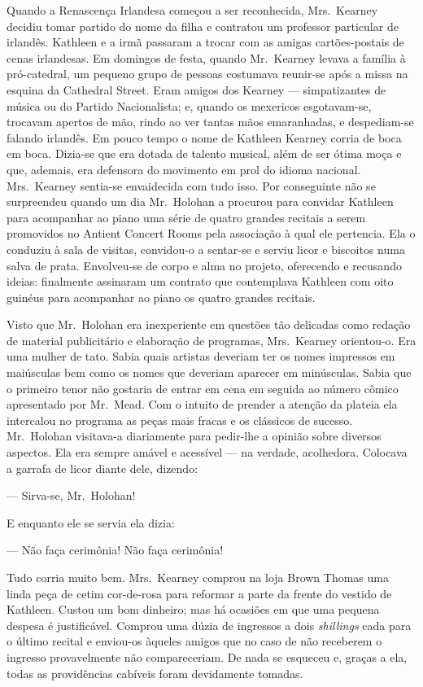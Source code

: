 Quando a Renascença Irlandesa começou a ser reconhecida, Mrs.~Kearney decidiu
tomar partido do nome da filha e contratou um professor particular de irlandês.
Kathleen e a irmã passaram a trocar com as amigas cartões-postais de cenas
irlandesas.  Em domingos de festa, quando Mr.~Kearney levava a família à
pró-catedral, um pequeno grupo de pessoas costumava reunir-se após a missa na
esquina da Cathedral Street.  Eram amigos dos Kearney --- simpatizantes de
música ou do Partido Nacionalista; e, quando os mexericos esgotavam-se,
trocavam apertos de mão, rindo ao ver tantas mãos emaranhadas, e despediam-se
falando irlandês.  Em pouco tempo o nome de Kathleen Kearney corria de boca em
boca.  Dizia-se que era dotada de talento musical, além de ser ótima moça e
que, ademais, era defensora do movimento em prol do idioma nacional.  
Mrs.~Kearney sentia-se envaidecida com tudo isso.  Por conseguinte não se
surpreendeu quando um dia Mr.~Holohan a procurou para convidar Kathleen para
acompanhar ao piano uma série de quatro grandes recitais a serem promovidos no
Antient Concert Rooms pela associação à qual ele pertencia.  Ela o conduziu à
sala de visitas, convidou-o a sentar-se e serviu licor e biscoitos numa salva
de prata.  Envolveu-se de corpo e alma no projeto, oferecendo e recusando
ideias: finalmente assinaram um contrato que contemplava Kathleen com oito
guinéus para acompanhar ao piano os quatro grandes recitais.

Visto que Mr.~Holohan era inexperiente em questões tão delicadas como redação
de material publicitário e elaboração de programas, Mrs.~Kearney orientou-o.
Era uma mulher de tato.  Sabia quais artistas deveriam ter os nomes impressos
em maiúsculas bem como os nomes que deveriam aparecer em minúsculas.  Sabia que
o primeiro tenor não gostaria de entrar em cena em seguida ao número cômico
apresentado por Mr.~Mead.  Com o intuito de prender a atenção da plateia ela
intercalou no programa as peças mais fracas e os clássicos de sucesso.  Mr.~Holohan 
visitava-a diariamente para pedir-lhe a opinião sobre diversos
aspectos.  Ela era sempre amável e acessível --- na verdade, acolhedora.
Colocava a garrafa de licor diante dele, dizendo:

--- Sirva-se, Mr.~Holohan!

E enquanto ele se servia ela dizia:

--- Não faça cerimônia!  Não faça cerimônia!

Tudo corria muito bem.  Mrs.~Kearney comprou na loja Brown Thomas uma linda
peça de cetim cor-de-rosa para reformar a parte da frente do vestido de
Kathleen.  Custou um bom dinheiro; mas há ocasiões em que uma pequena despesa é
justificável.  Comprou uma dúzia de ingressos a dois \textit{shillings} cada
para o último recital e enviou-os àqueles amigos que no caso de não receberem o
ingresso provavelmente não compareceriam.  De nada se esqueceu e, graças a ela,
todas as providências cabíveis foram devidamente tomadas.

